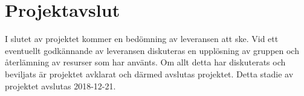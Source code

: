 \documentclass[projektplan/plan.tex]{subfiles}
\begin{document}
\section{Projektavslut}
I slutet av projektet kommer en bedömning av leveransen att ske. Vid ett eventuellt
godkännande av leveransen diskuteras en upplösning av gruppen och återlämning av
resurser som har använts. Om allt detta har diskuterats och beviljats är
projektet avklarat och därmed avslutas projektet. Detta stadie av projektet
avslutas 2018-12-21.
\end{document}
